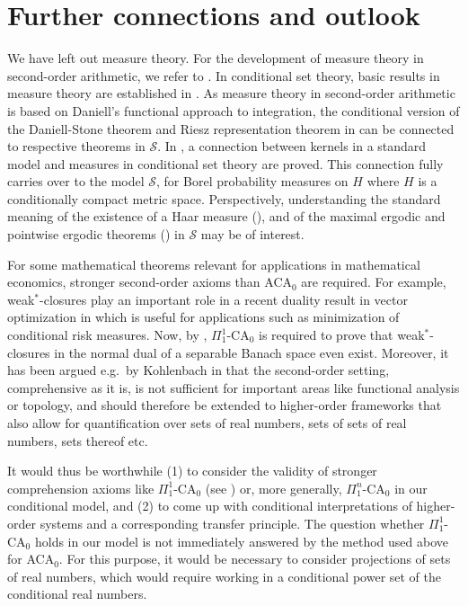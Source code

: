 \documentclass{jloganal}
\numberwithin{equation}{section}
\theoremstyle{plain}
\begin{document}
\section{Further connections and outlook}\label{s5}
We have left out measure theory.  
For the development of measure theory in second-order arithmetic, we refer to \cite{simic2004thesis,simpson2009subsystems,yu1993riesz}.  
In conditional set theory, basic results in measure theory are established in \cite{jamneshan2017measures}.  
As measure theory in second-order arithmetic is based on Daniell's functional approach to integration, the conditional version of the Daniell-Stone theorem and 
Riesz representation theorem in \cite[Section 5]{jamneshan2017measures} can be connected to respective theorems in $\mathcal{S}$. 
In \cite[Section 4]{jamneshan2017measures}, a connection between kernels in a standard model and measures in conditional set theory are proved.  
This connection fully carries over to the model $\mathcal{S}$, for Borel probability measures on $H$ where $H$ is a conditionally compact metric space. 
Perspectively, understanding the standard meaning of the existence of a Haar measure (\cite[Section X.1]{simpson2009subsystems}), 
and of the maximal ergodic and pointwise ergodic theorems (\cite[Chapter 5]{simic2004thesis}) in $\mathcal{S}$ may be of interest.  

For some mathematical theorems relevant for applications in mathematical economics, stronger second-order axioms than ACA$_0$ are required. 
For example, weak$^\ast$-closures play an important role in a recent duality result in vector optimization in \cite{grad2018perturbational} which is useful for applications such as minimization of conditional risk measures. Now, by \cite[Theorem X.2.9]{simpson2009subsystems}, $\Pi_{1}^{1}$-CA$_{0}$ is required to prove that weak$^{\ast}$-closures in the normal dual of 
a separable Banach space even exist. Moreover, it has been argued e.g.~by Kohlenbach in \cite{kohlenbach2000higher} that the second-order setting, comprehensive as it is, 
is not sufficient for important areas like functional analysis or topology, and should therefore be extended to higher-order frameworks that also allow for quantification over sets 
of real numbers, sets of sets of real numbers, sets thereof etc.

It would thus be worthwhile (1) to consider the validity of stronger comprehension axioms like $\Pi_{1}^{1}$-CA$_{0}$ (see \cite{simpson2009subsystems}) or, more generally, $\Pi_{1}^{n}$-CA$_{0}$ 
in our conditional model, and (2) to come up with conditional interpretations of higher-order systems and a corresponding transfer principle.
The question whether $\Pi_{1}^{1}$-CA$_{0}$ holds in our model is not immediately answered by the method used above for ACA$_{0}$. For this purpose, it would be necessary to consider projections of sets of real numbers, which would require working in a conditional power set of the conditional real numbers. 
\end{document}
